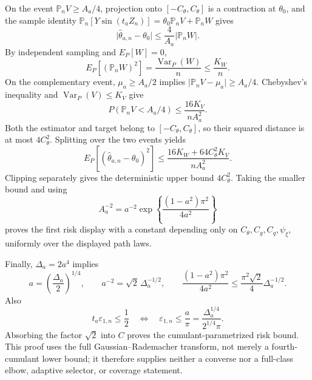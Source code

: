 On the event \(\mathbb P_nV\ge A_a/4\), projection onto \([-C_\theta,C_\theta]\) is a contraction at \(\theta_0\), and the sample identity \(\mathbb P_n[Y\sin(t_aZ_n)]=\theta_0\mathbb P_nV+\mathbb P_nW\) gives
\[
 \lvert\widehat\theta_{a,n}-\theta_0\rvert
 \le\frac{4}{A_a}\lvert\mathbb P_nW\rvert.
\]
By independent sampling and \(E_P[W]=0\),
\[
 E_P[(\mathbb P_nW)^2]=\frac{\operatorname{Var}_P(W)}{n}
 \le\frac{K_W}{n}.
\]
On the complementary event, \(\mu_a\ge A_a/2\) implies \(\lvert\mathbb P_nV-\mu_a\rvert\ge A_a/4\).  Chebyshev's inequality and \(\operatorname{Var}_P(V)\le K_V\) give
\[
 P(\mathbb P_nV<A_a/4)\le\frac{16K_V}{nA_a^2}.
\]
Both the estimator and target belong to \([-C_\theta,C_\theta]\), so their squared distance is at most \(4C_\theta^2\).  Splitting over the two events yields
\[
 E_P[(\widehat\theta_{a,n}-\theta_0)^2]
 \le\frac{16K_W+64C_\theta^2K_V}{nA_a^2}.
\]
Clipping separately gives the deterministic upper bound \(4C_\theta^2\).  Taking the smaller bound and using
\[
 A_a^{-2}=a^{-2}\exp\!\left\{\frac{(1-a^2)\pi^2}{4a^2}\right\}
\]
proves the first risk display with a constant depending only on \(C_\theta,C_g,C_q,\psi_\xi\), uniformly over the displayed path laws.

Finally, \(\Delta_a=2a^4\) implies
\[
 a=\left(\frac{\Delta_a}{2}\right)^{1/4},\qquad
 a^{-2}=\sqrt2\,\Delta_a^{-1/2},\qquad
 \frac{(1-a^2)\pi^2}{4a^2}
 \le\frac{\pi^2\sqrt2}{4}\Delta_a^{-1/2}.
\]
Also
\[
 t_a\varepsilon_{1,n}\le\frac12
 \quad\Longleftrightarrow\quad
 \varepsilon_{1,n}\le\frac{a}{\pi}
 =\frac{\Delta_a^{1/4}}{2^{1/4}\pi}.
\]
Absorbing the factor \(\sqrt2\) into \(C\) proves the cumulant-parametrized risk bound.  This proof uses the full Gaussian--Rademacher transform, not merely a fourth-cumulant lower bound; it therefore supplies neither a converse nor a full-class elbow, adaptive selector, or coverage statement.